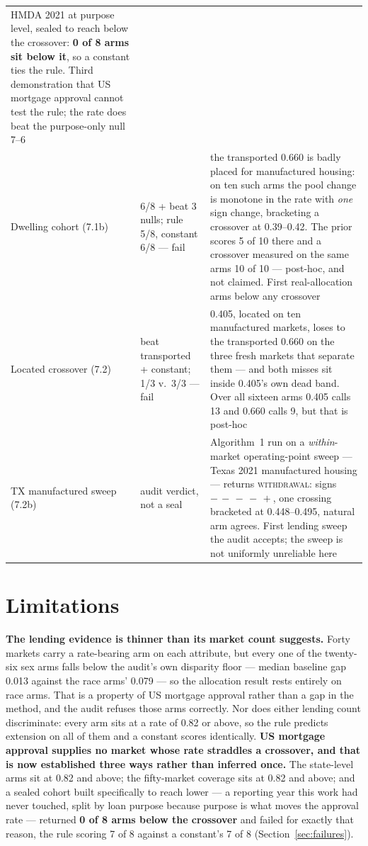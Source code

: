\documentclass[conference]{IEEEtran}
\begin{document}
\begin{table}[!t]
\begin{tabular}{@{}p{2.35cm}p{1.55cm}p{3.6cm}@{}}
HMDA 2021 at purpose level, sealed to reach below the crossover: \textbf{0 of 8 arms sit
below it}, so a constant ties the rule. Third demonstration that US mortgage approval cannot
test the rule; the rate does beat the purpose-only null 7--6 \\
Dwelling cohort (7.1b) & 6/8 + beat 3 nulls; rule 5/8, constant 6/8 --- fail &
the transported 0.660 is badly placed for manufactured housing: on ten such arms the pool
change is monotone in the rate with \emph{one} sign change, bracketing a crossover at
0.39--0.42. The prior scores 5 of 10 there and a crossover measured on the same arms 10 of 10
--- post-hoc, and not claimed. First real-allocation arms below any crossover \\
Located crossover (7.2) & beat transported + constant; 1/3 v.\ 3/3 --- fail &
0.405, located on ten manufactured markets, loses to the transported 0.660 on the three fresh
markets that separate them --- and both misses sit inside 0.405's own dead band. Over all
sixteen arms 0.405 calls 13 and 0.660 calls 9, but that is post-hoc \\
TX manufactured sweep (7.2b) & audit verdict, not a seal & Algorithm~1 run on a
\emph{within}-market operating-point sweep --- Texas 2021 manufactured housing --- returns
\textsc{withdrawal}: signs $-\,-\,-\,-\,+$, one crossing bracketed at 0.448--0.495, natural
arm agrees. First lending sweep the audit accepts; the sweep is not uniformly unreliable here
\\
\bottomrule
\end{tabular}
\end{table}

\section{Limitations}
\label{sec:limitations}

\textbf{The lending evidence is thinner than its market count suggests.} Forty markets carry a
rate-bearing arm on each attribute, but every one of the twenty-six sex arms falls below the
audit's own disparity floor --- median baseline gap 0.013 against the race arms' 0.079 --- so
the allocation result rests entirely on race arms. That is a property of US mortgage approval
rather than a gap in the method, and the audit refuses those arms correctly. Nor does either
lending count discriminate: every arm sits at a rate of 0.82 or above, so the rule predicts
extension on all of them and a constant scores identically. \textbf{US mortgage approval supplies no market whose rate straddles a crossover, and that
is now established three ways rather than inferred once.} The state-level arms sit at 0.82 and
above; the fifty-market coverage sits at 0.82 and above; and a sealed cohort built specifically
to reach lower --- a reporting year this work had never touched, split by loan purpose because
purpose is what moves the approval rate --- returned \textbf{0 of 8 arms below the crossover}
and failed for exactly that reason, the rule scoring 7 of 8 against a constant's 7 of 8
(Section~\ref{sec:failures}).
\end{document}
